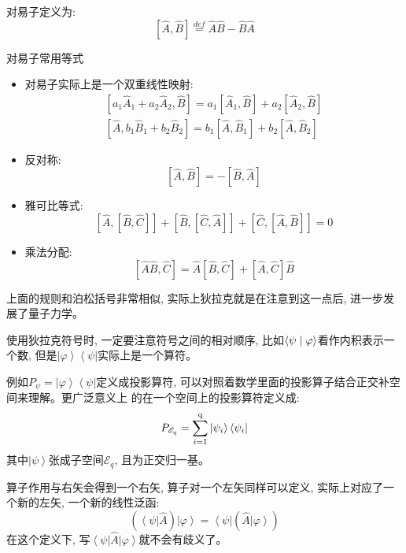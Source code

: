 对易子定义为: \[\left[\hat{A},\hat{B}\right]\overset{def}{=}\hat{A}\hat{B}-\hat{B}\hat{A}\]
\begin{theorem}{对易子常用等式}
    \begin{itemize}
        \item 对易子实际上是一个双重线性映射:
        \begin{equation*}
        \begin{array}{c}
            \left [ a_1\hat{A}_1+a_2\hat{A}_2 ,\hat{B}  \right ] = a_1\left [ \hat{A}_1, \hat{B}\right ] +a_2\left [ \hat{A}_2, \hat{B}\right ]\\
            \left [ \hat{A},b_1\hat{B}_1+b_2\hat{B}_2   \right ] = b_1\left [ \hat{A}, \hat{B}_1\right ] +b_2\left [ \hat{A}, \hat{B}_2\right ]
        \end{array}
        \end{equation*}
        \item 反对称: \[\left[\hat{A},\hat{B}\right]=- \left[\hat{B},\hat{A}\right]\]
        \item 雅可比等式: \[\left[\hat{A},\left[\hat{B},\hat{C}\right]\right]+\left[\hat{B},\left[\hat{C},\hat{A}\right]\right]+\left[\hat{C},\left[\hat{A},\hat{B}\right]\right]=0\]
        \item 乘法分配: \[\left[\hat{A}\hat{B},\hat{C}\right]=\hat{A}\left[\hat{B},\hat{C}\right]+\left[\hat{A},\hat{C}\right]\hat{B}\]
    \end{itemize}
\end{theorem}
上面的规则和泊松括号非常相似, 实际上狄拉克就是在注意到这一点后, 进一步发展了量子力学。
\begin{thinknote}
    使用狄拉克符号时, 一定要注意符号之间的相对顺序, 比如$\left\langle {\psi }\mathrel{\left | {\vphantom {\psi  \varphi }}
    \right. \kern-\nulldelimiterspace}{\varphi } \right\rangle $看作内积表示一个数, 但是$\left| \varphi  \right\rangle \left\langle \psi  \right|$实际上是一个算符。
\end{thinknote}
例如$P_{\psi}=\left| \varphi  \right\rangle \left\langle \psi  \right|$定义成投影算符, 可以对照着数学里面的投影算子结合正交补空间来理解。更广泛意义上
的在一个空间上的投影算符定义成:
\[P_{\mathscr{E}_q}=\sum\limits_{i = 1}^{\rm{q}} {\left| {{\psi _i}} \right\rangle \left\langle {{\psi _i}} \right|} \]
其中$\left|\psi\right\rangle$张成子空间$\mathscr{E}_q$, 且为正交归一基。

算子作用与右矢会得到一个右矢, 算子对一个左矢同样可以定义, 实际上对应了一个新的左矢, 一个新的线性泛函:
\[\left( {\left\langle \psi  \right|\hat A} \right)\left| \varphi  \right\rangle  = \left\langle \psi  \right|\left( {\hat A\left| \varphi  \right\rangle } \right)\]
在这个定义下, 写$\left\langle \psi  \right|\hat A\left| \varphi  \right\rangle $就不会有歧义了。
